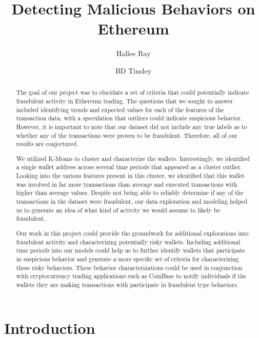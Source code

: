 \documentclass[sigconf]{acmart}
\title{Detecting Malicious Behaviors on Ethereum}
\author{Hallee Ray}
\affiliation{%
  \department{Computer Science Post Bacc.}
  \institution{University of Colorado - Boulder}
  \city{Boulder}
  \state{Colorado}
  \country{USA}
  \postcode{ZIP code}
}
\author{BD Tinsley}
\affiliation{%
  \department{Computer Science Post Bacc.}
  \institution{University of Colorado - Boulder}
  \city{Boulder}
  \state{Colorado}
  \country{USA}
  \postcode{ZIP code}
}
\begin{document}
\begin{abstract}
The goal of our project was to elucidate a set of criteria that could potentially indicate fraudulent activity in Ethereum trading. The questions that we sought to answer included identifying trends and expected values for each of the features of the transaction data, with a speculation that outliers could indicate suspicious behavior. However, it is important to note that our dataset did not include any true labels as to whether any of the transactions were proven to be fraudulent. Therefore, all of our results are conjectured. 

We utilized K-Means to cluster and characterize the wallets. Interestingly, we identified a single wallet address across several time periods that appeared as a cluster outlier. Looking into the various features present in this cluster, we identified that this wallet was involved in far more transactions than average and executed transactions with higher than average values. Despite not being able to reliably determine if any of the transactions in the dataset were fraudulent, our data exploration and modeling helped us to generate an idea of what kind of activity we would assume to likely be fraudulent. 

Our work in this project could provide the groundwork for additional explorations into fraudulent activity and characterizing potentially risky wallets. Including additional time periods into our models could help us to further identify wallets that participate in suspicious behavior and generate a more specific set of criteria for characterizing these risky behaviors. These behavior characterizations could be used in conjunction with cryptocurrency trading applications such as CoinBase to notify individuals if the wallets they are making transactions with participate in fraudulent type behaviors. 

\end{abstract}


\maketitle

\section{Introduction}
\end{document}
